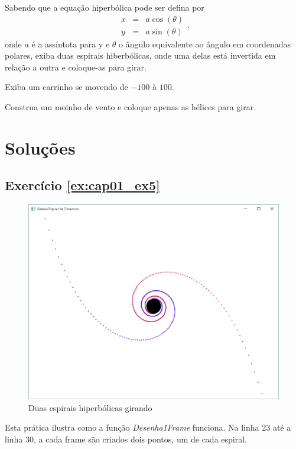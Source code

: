 





\begin{problems}
\prob
Sabendo que a equação hiperbólica pode ser defina por
$$
\begin{matrix}
x	& = &	a \cos(\theta) \\ 
y	& = &	a \sin(\theta)
\end{matrix}.
$$
onde $a$ é a assíntota para y e $\theta$ o ângulo equivalente ao ângulo em coordenadas polares, exiba duas espirais hiberbólicas, onde uma delas está invertida em relação a outra e coloque-as para girar.
\label{ex:cap01_ex5}

\prob
Exiba um carrinho se movendo de $-100$ à $100$.
\label{ex:cap01_ex6}

\prob
Construa um moinho de vento e coloque apenas as hélices para girar.
\label{ex:cap01_ex7}
\end{problems}

\section{Soluções}

\subsection*{Exercício \ref{ex:cap01_ex5}}
\begin{figure}[ht]
  \centerline{\includegraphics[width=.5\textwidth]{img/cap1_ex6.png}}
  \caption{Duas espirais hiperbólicas girando}
  \label{fig:cap01_ex5}
\end{figure}
Esta prática ilustra como a função \emph{Desenha1Frame} funciona. Na linha 23 até a linha 30, a cada frame são criados dois pontos, um de cada espiral.


